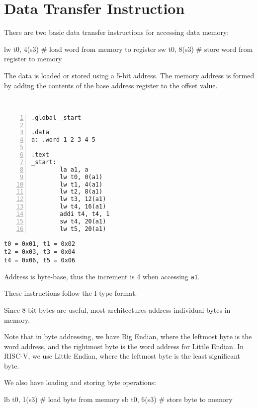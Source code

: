 \section{Data Transfer Instruction}
There are two basic data transfer instructions for accessing data memory:
\begin{codeBlock}
  lw t0, 4(s3)   # load word from memory to register
  sw t0, 8(s3)   # store word from register to memory
\end{codeBlock}

The data is loaded or stored using a 5-bit address. The memory address is formed by adding the contents of the base address register to the offset value.

\begin{eg}~

\begin{minipage}{0.5\textwidth}
\begin{Verbatim}[numbers=left,xleftmargin=5mm]
.global _start

.data
a: .word 1 2 3 4 5

.text
_start:
        la a1, a 
        lw t0, 0(a1) 
        lw t1, 4(a1) 
        lw t2, 8(a1) 
        lw t3, 12(a1) 
        lw t4, 16(a1) 
        addi t4, t4, 1
        sw t4, 20(a1)
        lw t5, 20(a1)
\end{Verbatim}
\end{minipage}
\begin{minipage}{0.5\textwidth}
\color{red}
\begin{verbatim}
t0 = 0x01, t1 = 0x02
t2 = 0x03, t3 = 0x04
t4 = 0x06, t5 = 0x06
\end{verbatim}
\end{minipage}
\begin{remark}
  Address is byte-base, thus the increment is 4 when accessing \verb|a1|. 
\end{remark}
\end{eg}

These instructions follow the I-type format.

Since 8-bit bytes are useful, most architectures address individual bytes in memory.

Note that in byte addressing, we have Big Endian, where the leftmost byte is the word address, and the rightmost byte is the word address for Little Endian. In RISC-V, we use Little Endian, where the leftmost byte is the least significant byte.

We also have loading and storing byte operations: 
\begin{codeBlock}
  lb t0, 1(s3)   # load byte from memory
  sb t0, 6(s3)   # store byte to memory
\end{codeBlock}

